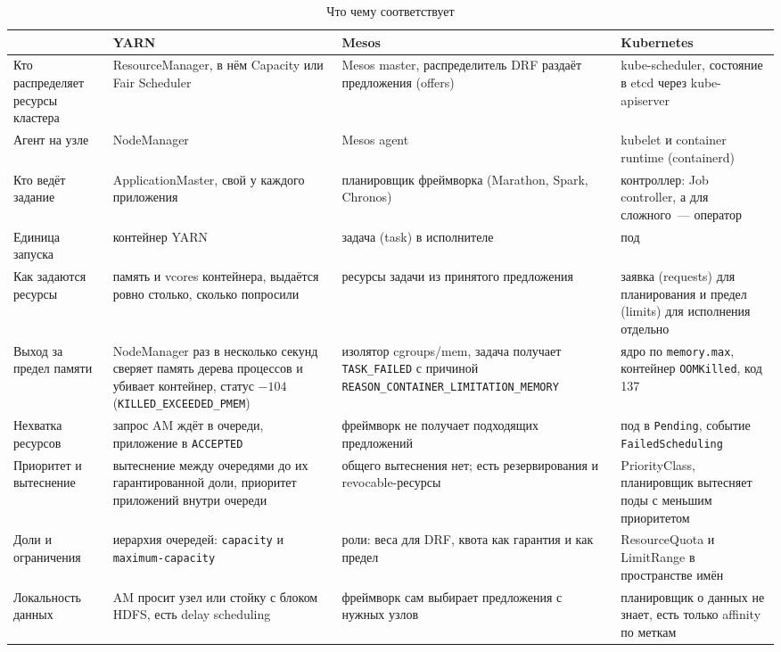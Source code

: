\documentclass[11pt,a4paper]{article}
\begin{document}
\begin{table}[H]
\centering
\footnotesize
\begin{tabularx}{\linewidth}{@{}>{\raggedright\arraybackslash}p{2.7cm}>{\raggedright\arraybackslash}X>{\raggedright\arraybackslash}X>{\raggedright\arraybackslash}X@{}}
\toprule
 & YARN & Mesos & Kubernetes \\
\midrule
Кто распределяет ресурсы кластера & ResourceManager, в нём Capacity или Fair Scheduler & Mesos master, распределитель DRF раздаёт предложения (offers) & kube-scheduler, состояние в etcd через kube-apiserver \\
Агент на узле & NodeManager & Mesos agent & kubelet и container runtime (containerd) \\
Кто ведёт задание & ApplicationMaster, свой у каждого приложения & планировщик фреймворка (Marathon, Spark, Chronos) & контроллер: Job controller, а для сложного~--- оператор \\
Единица запуска & контейнер YARN & задача (task) в исполнителе & под \\
Как задаются ресурсы & память и vcores контейнера, выдаётся ровно столько, сколько попросили & ресурсы задачи из принятого предложения & заявка (requests) для планирования и предел (limits) для исполнения отдельно \\
Выход за предел памяти & NodeManager раз в несколько секунд сверяет память дерева процессов и убивает контейнер, статус $-104$ (\texttt{KILLED\_EXCEEDED\_PMEM}) & изолятор cgroups/mem, задача получает \texttt{TASK\_FAILED} с причиной \texttt{REASON\_CONTAINER\_LIMITATION\_MEMORY} & ядро по \texttt{memory.max}, контейнер \texttt{OOMKilled}, код 137 \\
Нехватка ресурсов & запрос AM ждёт в очереди, приложение в \texttt{ACCEPTED} & фреймворк не получает подходящих предложений & под в \texttt{Pending}, событие \texttt{FailedScheduling} \\
Приоритет и вытеснение & вытеснение между очередями до их гарантированной доли, приоритет приложений внутри очереди & общего вытеснения нет; есть резервирования и revocable-ресурсы & PriorityClass, планировщик вытесняет поды с меньшим приоритетом \\
Доли и ограничения & иерархия очередей: \texttt{capacity} и \texttt{maximum-capacity} & роли: веса для DRF, квота как гарантия и как предел & ResourceQuota и LimitRange в пространстве имён \\
Локальность данных & AM просит узел или стойку с блоком HDFS, есть delay scheduling & фреймворк сам выбирает предложения с нужных узлов & планировщик о данных не знает, есть только affinity по меткам \\
\bottomrule
\end{tabularx}
\caption{Что чему соответствует}
\end{table}
\end{document}
